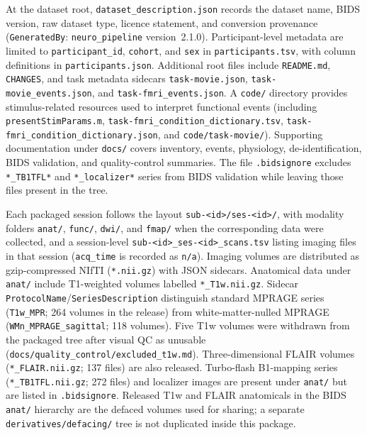 At the dataset root, \texttt{dataset\_description.json} records the dataset name, BIDS version, raw dataset type, licence statement, and conversion provenance (\texttt{GeneratedBy}: \texttt{neuro\_pipeline} version~2.1.0). Participant-level metadata are limited to \texttt{participant\_id}, \texttt{cohort}, and \texttt{sex} in \texttt{participants.tsv}, with column definitions in \texttt{participants.json}. Additional root files include \texttt{README.md}, \texttt{CHANGES}, and task metadata sidecars \texttt{task-movie.json}, \texttt{task-movie\_events.json}, and \texttt{task-fmri\_events.json}. A \texttt{code/} directory provides stimulus-related resources used to interpret functional events (including \texttt{presentStimParams.m}, \texttt{task-fmri\_condition\_dictionary.tsv}, \texttt{task-fmri\_condition\_dictionary.json}, and \texttt{code/task-movie/}). Supporting documentation under \texttt{docs/} covers inventory, events, physiology, de-identification, BIDS validation, and quality-control summaries. The file \texttt{.bidsignore} excludes \texttt{*\_TB1TFL*} and \texttt{*\_localizer*} series from BIDS validation while leaving those files present in the tree.

Each packaged session follows the layout \texttt{sub-<id>/ses-<id>/}, with modality folders \texttt{anat/}, \texttt{func/}, \texttt{dwi/}, and \texttt{fmap/} when the corresponding data were collected, and a session-level \texttt{sub-<id>\_ses-<id>\_scans.tsv} listing imaging files in that session (\texttt{acq\_time} is recorded as \texttt{n/a}). Imaging volumes are distributed as gzip-compressed NIfTI (\texttt{*.nii.gz}) with JSON sidecars. Anatomical data under \texttt{anat/} include T1-weighted volumes labelled \texttt{*\_T1w.nii.gz}. Sidecar \texttt{ProtocolName}/\texttt{SeriesDescription} distinguish standard MPRAGE series (\texttt{T1w\_MPR}; 264 volumes in the release) from white-matter-nulled MPRAGE (\texttt{WMn\_MPRAGE\_sagittal}; 118 volumes). Five T1w volumes were withdrawn from the packaged tree after visual QC as unusable (\texttt{docs/quality\_control/excluded\_t1w.md}). Three-dimensional FLAIR volumes (\texttt{*\_FLAIR.nii.gz}; 137 files) are also released. Turbo-flash B1-mapping series (\texttt{*\_TB1TFL.nii.gz}; 272 files) and localizer images are present under \texttt{anat/} but are listed in \texttt{.bidsignore}. Released T1w and FLAIR anatomicals in the BIDS \texttt{anat/} hierarchy are the defaced volumes used for sharing; a separate \texttt{derivatives/defacing/} tree is not duplicated inside this package.

